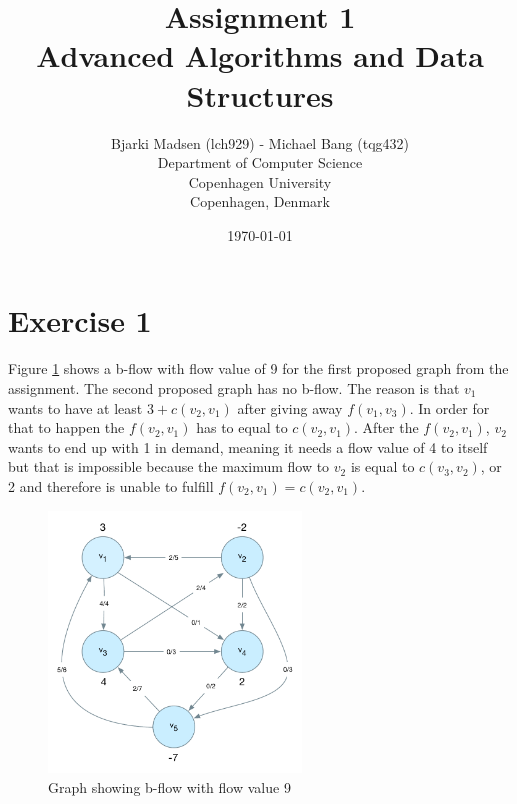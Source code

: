 \documentclass[12pt]{article}
\newcommand{\assignmentname}{Assignment 1}
\newcommand{\coursename}{Advanced Algorithms and Data Structures}
\newcommand{\studentname}{Bjarki Madsen (lch929) - Michael Bang (tqg432)}
\newcommand{\department}{Department of Computer Science}
\newcommand{\institution}{Copenhagen University}
\newcommand{\location}{Copenhagen, Denmark}
\begin{document}
\renewcommand\refname{References}

\title{\assignmentname \\ {\Large {\textsc \coursename}}}
\author{
        \studentname \\
        \department \\
        \institution \\
        \location
}
\date{\today}

\maketitle
\thispagestyle{empty}

\pagebreak

\section*{Exercise 1}

  Figure \ref{fig:e1_a_solution} shows a b-flow with flow value of 9 for the first proposed graph from the assignment. The second proposed graph has no b-flow. The reason is that $v_1$ wants to have at least $3 + c(v_2, v_1)$ after giving away $f(v_1, v_3)$. In order for that to happen the $f(v_2, v_1)$ has to equal to $c(v_2, v_1)$. After the $f(v_2, v_1)$, $v_2$ wants to end up with 1 in demand, meaning it needs a flow value of 4 to itself but that is impossible because the maximum flow to $v_2$ is equal to $c(v_3, v_2)$, or 2 and therefore is unable to fulfill $f(v_2, v_1) = c(v_2, v_1)$.

  \begin{figure}[h]
    \centering
      \includegraphics[width=0.6\textwidth]{figures/e1_a_solution}
    \caption{Graph showing b-flow with flow value 9}
    \label{fig:e1_a_solution}
  \end{figure}
\end{document}
